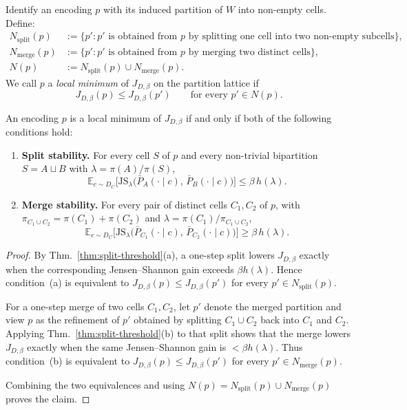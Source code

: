 \documentclass[twoside,11pt]{article}
\newcommand{\E}{\mathbb{E}}
\newcommand{\JS}{\mathrm{JS}}
\newcommand{\thmref}[1]{Thm.~\ref{#1}}
\begin{document}
\begin{definition}\label{def:partition-neighborhood}
Identify an encoding $p$ with its induced partition of $W$ into non-empty cells. Define:
\begin{align*}
N_{\mathrm{split}}(p)
&:= \{p' : p' \text{ is obtained from } p \text{ by splitting one cell into two non-empty subcells}\},\\
N_{\mathrm{merge}}(p)
&:= \{p' : p' \text{ is obtained from } p \text{ by merging two distinct cells}\},\\
N(p) &:= N_{\mathrm{split}}(p) \cup N_{\mathrm{merge}}(p).
\end{align*}
We call $p$ a \emph{local minimum} of $J_{D,\beta}$ on the partition lattice if
\[
J_{D,\beta}(p) \le J_{D,\beta}(p')
\qquad
\text{for every } p' \in N(p).
\]
\end{definition}

\begin{proposition}\label{prop:partition-local-min}
An encoding $p$ is a local minimum of $J_{D,\beta}$ if and only if both of the following conditions hold:
\begin{enumerate}[label=(\alph*)]
\item \textbf{Split stability.} For every cell $S$ of $p$ and every non-trivial bipartition $S=A \sqcup B$ with $\lambda=\pi(A)/\pi(S)$,
\[
\E_{c \sim D_C}\bigl[
  \JS_{\lambda}\bigl(\bar P_A(\cdot \mid c),\, \bar P_B(\cdot \mid c)\bigr)
\bigr]
\le \beta\, h(\lambda).
\]

\item \textbf{Merge stability.} For every pair of distinct cells $C_1,C_2$ of $p$, with $\pi_{C_1\cup C_2}=\pi(C_1)+\pi(C_2)$ and $\lambda=\pi(C_1)/\pi_{C_1\cup C_2}$,
\[
\E_{c \sim D_C}\bigl[
  \JS_{\lambda}\bigl(\bar P_{C_1}(\cdot \mid c),\, \bar P_{C_2}(\cdot \mid c)\bigr)
\bigr]
\ge \beta\, h(\lambda).
\]
\end{enumerate}
\end{proposition}

\begin{proof}
By \thmref{thm:split-threshold}(a), a one-step split lowers $J_{D,\beta}$ exactly when the corresponding Jensen--Shannon gain exceeds $\beta h(\lambda)$. Hence condition~(a) is equivalent to $J_{D,\beta}(p)\le J_{D,\beta}(p')$ for every $p' \in N_{\mathrm{split}}(p)$.

For a one-step merge of two cells $C_1,C_2$, let $p'$ denote the merged partition and view $p$ as the refinement of $p'$ obtained by splitting $C_1 \cup C_2$ back into $C_1$ and $C_2$. Applying \thmref{thm:split-threshold}(b) to that split shows that the merge lowers $J_{D,\beta}$ exactly when the same Jensen--Shannon gain is $< \beta h(\lambda)$. Thus condition~(b) is equivalent to $J_{D,\beta}(p)\le J_{D,\beta}(p')$ for every $p' \in N_{\mathrm{merge}}(p)$.

Combining the two equivalences and using $N(p)=N_{\mathrm{split}}(p)\cup N_{\mathrm{merge}}(p)$ proves the claim.
\end{proof}
\end{document}
